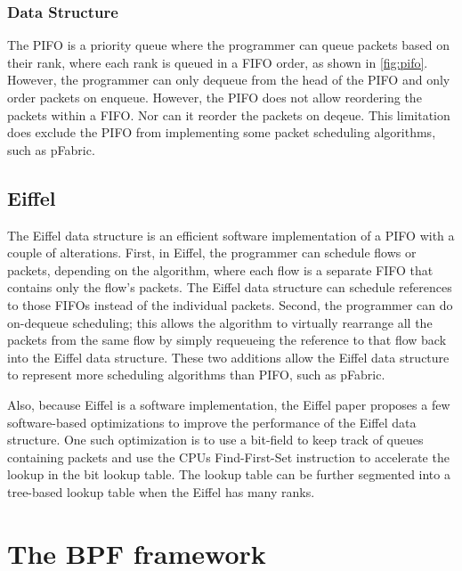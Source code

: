 \documentclass[sigconf, nonacm]{acmart}
\begin{document}
\subsubsection{Data Structure}

The PIFO is a priority queue where the programmer can queue packets based on their rank, where each rank is queued in a FIFO order, as shown in \cref{fig:pifo}. However, the programmer can only dequeue from the head of the PIFO and only order packets on enqueue. However, the PIFO does not allow reordering the packets within a FIFO. Nor can it reorder the packets on deqeue. This limitation does exclude the PIFO from implementing some packet scheduling algorithms, such as pFabric\cite{alizadeh2013pfabric}.


\subsection{Eiffel} \label{sec:eiffel}

The Eiffel data structure is an efficient software implementation of a PIFO with a couple of alterations. First, in Eiffel, the programmer can schedule flows or packets, depending on the algorithm, where each flow is a separate FIFO that contains only the flow's packets. The Eiffel data structure can schedule references to those FIFOs instead of the individual packets. Second, the programmer can do on-dequeue scheduling; this allows the algorithm to virtually rearrange all the packets from the same flow by simply requeueing the reference to that flow back into the Eiffel data structure. These two additions allow the Eiffel data structure to represent more scheduling algorithms than PIFO, such as pFabric\cite{alizadeh2013pfabric}.

Also, because Eiffel is a software implementation, the Eiffel paper proposes a few software-based optimizations to improve the performance of the Eiffel data structure. One such optimization is to use a bit-field to keep track of queues containing packets and use the CPUs Find-First-Set instruction to accelerate the lookup in the bit lookup table. The lookup table can be further segmented into a tree-based lookup table when the Eiffel has many ranks.


\section{The BPF framework}
\end{document}
